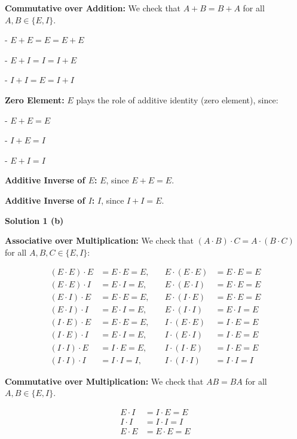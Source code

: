 \documentclass[6pt]{article}
\begin{document}
\textbf{Commutative over Addition:} We check that $A + B = B + A$
    for all $A, B \in \{E, I\}$.

- $E + E = E = E + E$

- $E + I = I = I + E$

- $I + I = E = I + I$

\textbf{Zero Element:} $E$ plays the role of additive identity (zero element), since:

- $E + E = E$

- $I + E = I$

- $E + I = I$

\textbf{Additive Inverse of $E$:} $E$, since $E + E = E$.

\textbf{Additive Inverse of $I$:} $I$, since $I + I = E$.

\textbf{Solution 1 (b)}

\textbf{Associative over Multiplication:} We check that $(A \cdot B) \cdot C = A \cdot (B \cdot C)$
for all $A, B, C \in \{E, I\}$:

\begin{align*}
( E \cdot E ) \cdot E &= E \cdot E = E, &\quad E \cdot ( E \cdot E ) &= E \cdot E = E \\
( E \cdot E ) \cdot I &= E \cdot I = E, &\quad E \cdot ( E \cdot I ) &= E \cdot E = E \\
( E \cdot I ) \cdot E &= E \cdot E = E, &\quad E \cdot ( I \cdot E ) &= E \cdot E = E \\
( E \cdot I ) \cdot I &= E \cdot I = E, &\quad E \cdot ( I \cdot I ) &= E \cdot I = E \\
( I \cdot E ) \cdot E &= E \cdot E = E, &\quad I \cdot ( E \cdot E ) &= I \cdot E = E \\
( I \cdot E ) \cdot I &= E \cdot I = E, &\quad I \cdot ( E \cdot I ) &= I \cdot E = E \\
( I \cdot I ) \cdot E &= I \cdot E = E, &\quad I \cdot ( I \cdot E ) &= I \cdot E = E \\
( I \cdot I ) \cdot I &= I \cdot I = I, &\quad I \cdot ( I \cdot I ) &= I \cdot I = I
\end{align*}

\textbf{Commutative over Multiplication:} We check that $AB = BA$ 
    for all $A, B \in \{E, I\}$.

\begin{align*}
E \cdot I &= I \cdot E = E \\
I \cdot I &= I \cdot I = I \\
E \cdot E &= E \cdot E = E
\end{align*}
\end{document}
